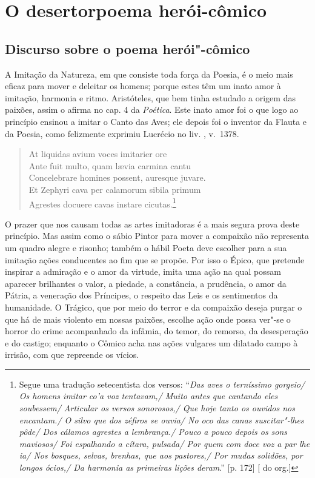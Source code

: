 \part[O desertor: poema herói-cômico]{O desertor\break poema herói-cômico} 

\chapter{Discurso sobre o poema herói"-cômico}

A Imitação da Natureza, em que consiste toda força da Poesia, 				\index{\Iminat}
é o meio mais eficaz para mover e deleitar os homens; 					\index{\Util}
porque estes têm um inato amor à imitação, harmonia e ritmo.
Aristóteles, que bem tinha estudado a origem das paixões, assim o afirma no 
cap. 4 da \textit{Poética}. 							\index{\Arist}
Este inato amor foi o que logo ao princípio ensinou a imitar o Canto das Aves; ele 
depois foi o inventor da Flauta e da Poesia, como felizmente exprimiu Lucrécio
no liv. , v.~1378.								\index{\Lucre} \index{\Poet}


\begin{verse}
At liquidas avium voces imitarier ore \\
Ante fuit multo, quam l\ae via carmina cantu \\
Concelebrare homines possent, auresque \qb{}juvare. \\
Et Zephyri cava per calamorum sibila \qb{}primum \\
Agrestes docuere cavas instare cicutas.\footnote{ Segue uma tradução
setecentista dos versos: ``\textit{Das aves o terníssimo gorgeio/ Os homens
imitar co'a voz tentavam,/ Muito antes que cantando eles soubessem/ Articular
os versos sonorosos,/ Que hoje tanto os ouvidos nos encantam./ O silvo que dos
zéfiros se ouvia/ No oco das canas suscitar"-lhes pôde/ Dos cálamos agrestes a 
lembrança./ Pouco a pouco depois os sons maviosos/ Foi espalhando a cítara,
pulsada/ Por quem com doce voz a par lhe ia/ Nos bosques, selvas, brenhas, que
aos pastores,/ Por mudas solidões, por longos ócios,/ Da harmonia as primeiras
lições deram}.'' [p. 172] [ do org.] }\\[10pt] 				\index{\Zefir}
\end{verse}

O prazer que nos causam todas as artes imitadoras
é a mais segura prova deste princípio. Mas assim 
como o sábio Pintor para mover a compaixão não 						%
representa um quadro alegre e risonho; também o hábil 
Poeta deve escolher para a sua imitação ações 
conducentes ao fim que se propõe. Por isso o Épico, 					\index{\Epico}
que pretende inspirar a admiração e o amor da virtude, 
imita uma ação na qual possam aparecer brilhantes o valor,
a piedade, a constância, a prudência, o amor da Pátria, 
a veneração dos Príncipes, o respeito das Leis e os 
sentimentos da humanidade. O Trágico, que por meio do terror 				\index{\Trag}
e da compaixão deseja purgar o que há de mais violento em  
nossas paixões, escolhe ação onde possa ver"-se o horror 
do crime acompanhado da infâmia, do temor, do remorso, da desesperação 
e do castigo; enquanto o Cômico acha nas ações vulgares 				\index{\Comic}
um dilatado campo à irrisão, com que repreende os vícios.

